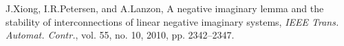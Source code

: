 \documentclass[letterpaper, 10pt, conference]{ieeeconf}  %
\begin{document}
\begin{thebibliography}{99}
J.Xiong, I.R.Petersen, and A.Lanzon,
A negative imaginary lemma and the stability of
interconnections of linear negative imaginary systems,
\textit{IEEE Trans. Automat. Contr.},
vol. 55, no. 10, 2010, pp. 2342--2347.

\end{thebibliography}
\end{document}
